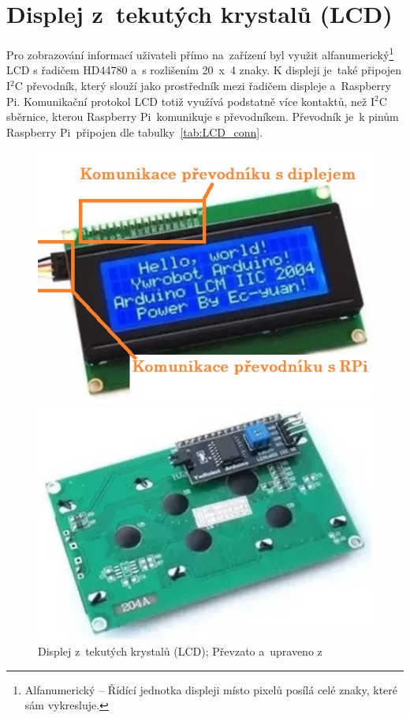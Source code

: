 \section{Displej z~tekutých krystalů (LCD)}
Pro zobrazování informací uživateli přímo na~zařízení byl využit alfanumerický\footnote{Alfanumerický -- Řídící jednotka displeji místo pixelů posílá celé znaky, které sám vykresluje.} LCD s řadičem HD44780 a~s rozlišením 20~x~4 znaky. K displeji je~také připojen I$^{2}$C převodník, který slouží jako prostředník mezi řadičem displeje a~Raspberry Pi.
Komunikační protokol LCD totiž využívá podstatně více kontaktů, než I$^{2}$C sběrnice, kterou Raspberry Pi~komunikuje s převodníkem. Převodník je~k pinům Raspberry Pi~připojen dle tabulky~\ref{tab:LCD_conn}.

\begin{figure}[htb]
  \centering
  \begin{minipage}{0.45\textwidth}
    \centering
    \includegraphics[width=1\textwidth]{img/LCD_front.jpg} %
    \caption{\label{fig:LCD_front} Displej z~tekutých krystalů (LCD); Převzato a~upraveno z~\cite{laskakit-LCD}}
  \end{minipage}\hfill
  \begin{minipage}{0.45\textwidth}
    \centering
    \includegraphics[width=1\textwidth]{img/LCD_back.jpg} %

\end{minipage}
\end{figure}

